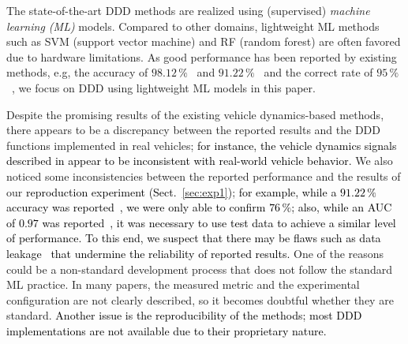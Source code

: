\documentclass[letterpaper, 10 pt, conference]{ieeeconf}  %
\newcommand{\Review}[1]{\textcolor{black}{#1}}
\newcommand{\Ishii}[1]{\textcolor{black}{#1}}
\begin{document}
The state-of-the-art DDD methods are realized using (supervised) \emph{machine learning (ML)} models.
Compared to other domains, lightweight ML methods such as SVM (support vector machine) and RF (random forest) are often favored due to hardware limitations.
As good performance has been reported by existing methods, e.g, the accuracy of $98.12\,\%$~\cite{Arefnezhad2019} and $91.22\,\%$~\cite{Wang2022} and the correct rate of $95\,\%$~\cite{Zhao2009}, we focus on DDD using lightweight ML models in this paper.

Despite the promising results of the existing vehicle dynamics-based methods,
there appears to be a discrepancy between the reported results and the DDD functions implemented in real vehicles;
\Review{for instance, the vehicle dynamics signals described in \cite{Zhao2009} appear to be inconsistent with real-world vehicle behavior.}
We also noticed some inconsistencies between the reported performance and the results of our \Ishii{reproduction experiment (Sect.~\ref{sec:exp1})};
\Review{for example, while a $91.22\,\%$ accuracy was reported~\cite{Wang2022}, we were only able to confirm $76\,\%$; also, while an AUC of $0.97$ was reported~\cite{Arefnezhad2019}, it was necessary to use test data to achieve a similar level of performance.}
\Ishii{To this end, we suspect that there may be flaws such as data leakage~\cite{Kapoor2023} that undermine the reliability of reported results.}
One of the reasons could be a non-standard development process that does not follow the standard ML practice.
In many papers, the measured metric and the experimental configuration are not clearly described, so it becomes doubtful whether they are standard.
%
\Ishii{Another issue is the reproducibility of the methods;
most DDD implementations are not available due to their proprietary nature.}
\end{document}
